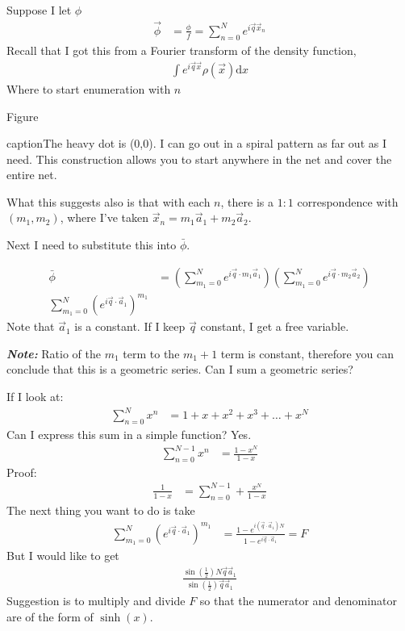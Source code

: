 \documentclass{article}
\renewcommand{\d}[0]{\mathrm{d}}
\newcommand{\qvec}[0]{\vec{q}}
\newcommand{\xvec}[0]{\vec{x}}
\newcommand{\aone}[0]{\vec{a}_1}
\newcommand{\atwo}[0]{\vec{a}_2}
\newcommand{\note}[1]{\vspace{3\parsep}\textit{\textbf{Note: }}#1\vspace{2\parsep}}
\begin{document}
\begin{section}{Suppose I let $\phi$}
	\begin{align*}
		\vec{\phi} &= \frac{\phi}{f}=\sum_{n=0}^{N}e^{i\qvec\xvec_n}
	\end{align*}
	Recall that I got this from a Fourier transform of the density function, 
	\begin{align*}
		\int e^{i\qvec\xvec} \rho(\xvec)\d x
	\end{align*}
	Where to start enumeration with $n$

	Figure
	
	caption{The heavy dot is (0,0). I can go out in a spiral pattern as far out as I need. This construction allows you to start anywhere in the net and cover the entire net.}

	
	What this suggests also is that with each $n$, there is a $1:1$ correspondence with $(m_1,m_2)$, where I've taken $\xvec_n = m_1\vec{a}_1 + m_2\vec{a}_2$.

	Next I need to substitute this into $\bar{\phi}$.

	\begin{align*}
		\bar{\phi} &= \left(\sum_{m_1=0}^{N}e^{i\qvec\cdot m_1\aone}\right)\left(\sum_{m_1=0}^{N}e^{i\qvec\cdot m_2\atwo}\right)\\
		\sum_{m_1=0}^{N}\left(e^{i\qvec\cdot \aone}\right)^{m_1}
	\end{align*}
	Note that $\aone$ is a constant. If I keep $\qvec$ constant, I get a free variable. 

	\note{Ratio of the $m_1$ term to the $m_1+1$ term is constant, therefore you can conclude that this is a geometric series. Can I sum a geometric series?}

	If I look at:
	\begin{align*}
		\sum_{n=0}^{N}x^n &= 1 + x + x^2 + x^3 + \dots + x^N
	\end{align*}
	Can I express this sum in a simple function? Yes. 
	\begin{align*}
		\sum_{n=0}^{N-1}x^n &= \frac{1-x^N}{1-x}
	\end{align*}
	Proof:
	\begin{align*}
		\frac{1}{1-x}&= \sum_{n=0}^{N-1}+\frac{x^N}{1-x}
	\end{align*}
	The next thing you want to do is take
	\begin{align*}
		\sum_{m_1=0}^{N}(e^{i\qvec\cdot\aone})^{m_1}&=\frac{1-e^{i(\qvec\cdot\aone)N}}{1-e^{i\qvec\cdot\aone}} = F
	\end{align*}
	But I would like to get
	\begin{align*}
		\frac{\sin{(\frac{1}{2})}N\qvec\aone}{\sin{(\frac{1}{2})}\qvec\aone}
	\end{align*}
	Suggestion is to multiply and divide $F$ so that the numerator and denominator are of the form of $\sinh{(x)}$.


\end{section}
\end{document}
